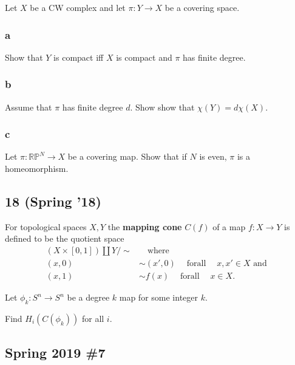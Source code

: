 Let \(X\) be a CW complex and let \(\pi : Y \to X\) be a covering space.

\hypertarget{a-2}{%
\subsubsection{a}\label{a-2}}

Show that \(Y\) is compact iff \(X\) is compact and \(\pi\) has finite
degree.

\hypertarget{b-2}{%
\subsubsection{b}\label{b-2}}

Assume that \(\pi\) has finite degree \(d\). Show show that
\(\chi (Y ) = d \chi (X)\).

\hypertarget{c}{%
\subsubsection{c}\label{c}}

Let \(\pi :{\mathbb{RP}}^N \to X\) be a covering map. Show that if \(N\)
is even, \(\pi\) is a homeomorphism.

\hypertarget{spring-18-2}{%
\subsection{18 (Spring '18)}\label{spring-18-2}}

For topological spaces \(X, Y\) the \textbf{mapping cone} \(C(f )\) of a
map \(f : X \to Y\) is defined to be the quotient space
\begin{align*}  
(X \times [0, 1]){\textstyle\coprod}Y / \sim &{\quad \operatorname{where} \quad}  \\ 
(x, 0) &\sim (x', 0) {\quad \operatorname{for all} \quad} x, x' \in X \text{ and } \\ 
(x, 1) &\sim f (x) {\quad \operatorname{for all } \quad} x \in X
.\end{align*}

Let \(\phi_k : S^n \to S^n\) be a degree \(k\) map for some integer
\(k\).

Find \(H_i(C(\phi_k ))\) for all \(i\).

\hypertarget{spring-2019-7}{%
\subsection{Spring 2019 \#7}\label{spring-2019-7}}

